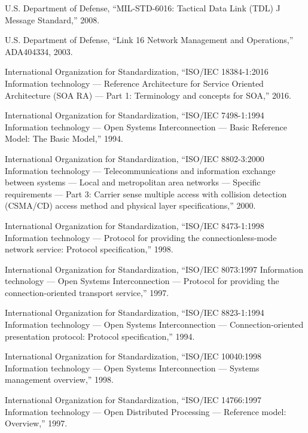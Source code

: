 \documentclass{article}
\begin{document}
\begin{thebibliography}{10}

U.S. Department of Defense, ``MIL-STD-6016: Tactical Data Link (TDL) J Message Standard,'' 2008.

U.S. Department of Defense, ``Link 16 Network Management and Operations,'' ADA404334, 2003.

International Organization for Standardization, ``ISO/IEC 18384-1:2016 Information technology — Reference Architecture for Service Oriented Architecture (SOA RA) — Part 1: Terminology and concepts for SOA,'' 2016.

International Organization for Standardization, ``ISO/IEC 7498-1:1994 Information technology — Open Systems Interconnection — Basic Reference Model: The Basic Model,'' 1994.

International Organization for Standardization, ``ISO/IEC 8802-3:2000 Information technology — Telecommunications and information exchange between systems — Local and metropolitan area networks — Specific requirements — Part 3: Carrier sense multiple access with collision detection (CSMA/CD) access method and physical layer specifications,'' 2000.

International Organization for Standardization, ``ISO/IEC 8473-1:1998 Information technology — Protocol for providing the connectionless-mode network service: Protocol specification,'' 1998.

International Organization for Standardization, ``ISO/IEC 8073:1997 Information technology — Open Systems Interconnection — Protocol for providing the connection-oriented transport service,'' 1997.

International Organization for Standardization, ``ISO/IEC 8823-1:1994 Information technology — Open Systems Interconnection — Connection-oriented presentation protocol: Protocol specification,'' 1994.

International Organization for Standardization, ``ISO/IEC 10040:1998 Information technology — Open Systems Interconnection — Systems management overview,'' 1998.

International Organization for Standardization, ``ISO/IEC 14766:1997 Information technology — Open Distributed Processing — Reference model: Overview,'' 1997.

\end{thebibliography}
\end{document}
